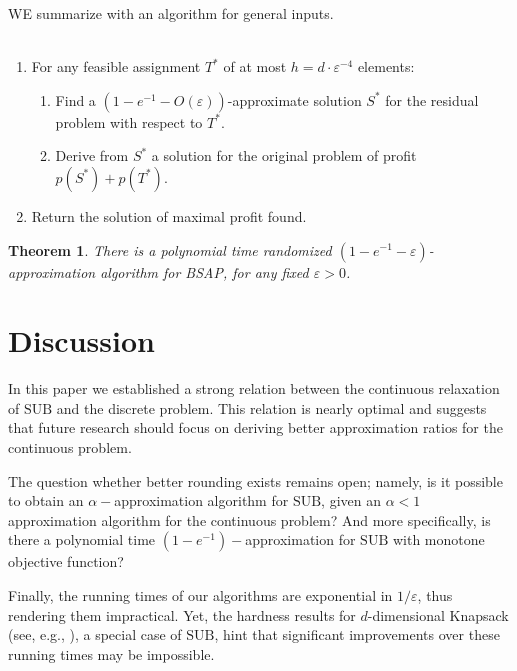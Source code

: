 \documentclass[11pt]{article}
\newtheorem{theorem}{Theorem}[section]
\newcommand{\eps}{\varepsilon}
\newcommand{\bS}{S}
\newcommand{\SUB}{\mbox{SUB}}
\begin{document}
{WE summarize with an algorithm for general inputs.
\\
\\
\begin{enumerate}
\item For any feasible assignment $T^*$ of at most $h=d \cdot \eps^{-4}$ elements:
\begin{enumerate}
\item Find a $(1-e^{-1} -O(\eps))$-approximate solution $\bS^*$ for
the residual problem with respect to $T^*$.
\item Derive from $\bS^*$ a solution for the original problem
of profit $p(\bS^*)+p(T^*)$.
\end{enumerate}
\item
Return  the solution of maximal profit found.
\end{enumerate}

\begin{theorem}
\label{thm:alg_bgap}
There is a polynomial time randomized $(1-e^{-1} - \eps)$-approximation algorithm for BSAP,
for any fixed $\eps > 0$.
\end{theorem}
}
\section{Discussion}

In this paper we established a strong relation between the
continuous relaxation of $\SUB$ and the discrete problem. This
relation is nearly optimal and suggests that future research
should focus on deriving better approximation ratios for the
continuous problem.

The question whether better rounding exists remains open; namely, is it
 possible to obtain an $\alpha-$approximation algorithm for $\SUB$, given
an $\alpha<1$ approximation algorithm for the continuous problem?
And more specifically, is there a polynomial time $(1-e^{-1})-$approximation
for $\SUB$ with monotone objective function?

Finally, the running times of our algorithms are exponential in $1/\eps$, thus rendering them impractical.
 Yet, the hardness results for $d$-dimensional Knapsack (see, e.g., \cite{KPP04,MC84,KS10}),
    a special case of $\SUB$,
  hint that significant improvements over these running times may be impossible.









\end{document}
